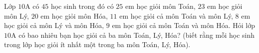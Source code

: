 \begin{ex}
Lớp $10$A có $45$ học sinh trong đó có $25$ em học giỏi môn Toán, $23$ em học giỏi môn Lý, $20$ em học giỏi môn Hóa, $11$ em học giỏi cả môn Toán và môn Lý, $8$ em học giỏi cả môn Lý và môn Hóa, $9$ em học giỏi cả môn Toán và môn Hóa. Hỏi lớp $10$A có bao nhiêu bạn học giỏi cả ba môn Toán, Lý, Hóa? (biết rằng mỗi học sinh trong lớp học giỏi ít nhất một trong ba môn Toán, Lý, Hóa).
\end{ex}
